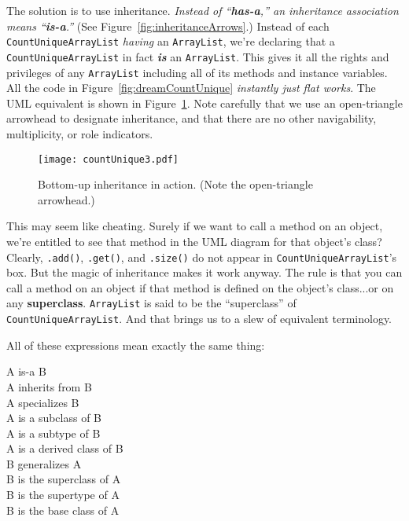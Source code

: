 The solution is to use inheritance. \textit{Instead of ``\textbf{has-a},'' an
inheritance association means ``\textbf{is-a}.''} (See
Figure~\ref{fig:inheritanceArrows}.) Instead of each
\texttt{CountUniqueArrayList} \textit{having} an \texttt{ArrayList},
we're declaring that a \texttt{CountUniqueArrayList} in fact
\textbf{\textit{is}} an \texttt{ArrayList}. This gives it all the rights and
privileges of any \texttt{ArrayList} including all of its methods and instance
variables. All the code in Figure~\ref{fig:dreamCountUnique} \textit{instantly
just flat works}. The UML equivalent is shown in
Figure~\ref{fig:countUnique3}. Note carefully that we use an open-triangle
arrowhead to designate inheritance, and that there are no other navigability,
multiplicity, or role indicators.

\begin{figure}[h]
\centering
\texttt{[image: countUnique3.pdf]}
\caption{Bottom-up inheritance in action. (Note the open-triangle arrowhead.)}
\label{fig:countUnique3}
\end{figure}

This may seem like cheating. Surely if we want to call a method on an object,
we're entitled to see that method in the UML diagram for that object's class?
Clearly, \texttt{.add()}, \texttt{.get()}, and \texttt{.size()} do not appear
in \texttt{CountUniqueArrayList}'s box. But the magic of inheritance makes it
work anyway. The rule is that you can call a method on an object if that
method is defined on the object's class...or on any \textbf{superclass}.
\texttt{ArrayList} is said to be the ``superclass'' of
\texttt{CountUniqueArrayList}. And that brings us to a slew of equivalent
terminology.

\begin{samepage}
All of these expressions mean exactly the same thing:
\begin{center}
\small
A is-a B\\
A inherits from B\\
A specializes B\\
A is a subclass of B\\
A is a subtype of B\\
A is a derived class of B\\
B generalizes A\\
B is the superclass of A\\
B is the supertype of A\\
B is the base class of A\\
\end{center}
\end{samepage}

